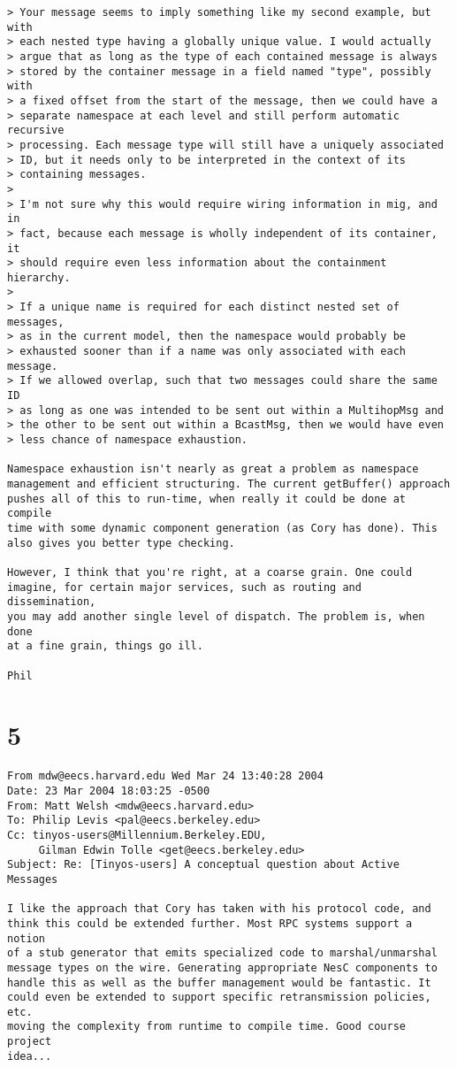\documentclass[10pt]{article}
\begin{document}
\begin{verbatim}
> Your message seems to imply something like my second example, but with 
> each nested type having a globally unique value. I would actually 
> argue that as long as the type of each contained message is always 
> stored by the container message in a field named "type", possibly with 
> a fixed offset from the start of the message, then we could have a 
> separate namespace at each level and still perform automatic recursive 
> processing. Each message type will still have a uniquely associated 
> ID, but it needs only to be interpreted in the context of its 
> containing messages.
>
> I'm not sure why this would require wiring information in mig, and in 
> fact, because each message is wholly independent of its container, it 
> should require even less information about the containment hierarchy.
>
> If a unique name is required for each distinct nested set of messages, 
> as in the current model, then the namespace would probably be 
> exhausted sooner than if a name was only associated with each message. 
> If we allowed overlap, such that two messages could share the same ID 
> as long as one was intended to be sent out within a MultihopMsg and 
> the other to be sent out within a BcastMsg, then we would have even 
> less chance of namespace exhaustion.

Namespace exhaustion isn't nearly as great a problem as namespace 
management and efficient structuring. The current getBuffer() approach 
pushes all of this to run-time, when really it could be done at compile 
time with some dynamic component generation (as Cory has done). This 
also gives you better type checking.

However, I think that you're right, at a coarse grain. One could 
imagine, for certain major services, such as routing and dissemination, 
you may add another single level of dispatch. The problem is, when done 
at a fine grain, things go ill.

Phil

\end{verbatim}

\section*{5}

\begin{verbatim}
From mdw@eecs.harvard.edu Wed Mar 24 13:40:28 2004
Date: 23 Mar 2004 18:03:25 -0500
From: Matt Welsh <mdw@eecs.harvard.edu>
To: Philip Levis <pal@eecs.berkeley.edu>
Cc: tinyos-users@Millennium.Berkeley.EDU,
     Gilman Edwin Tolle <get@eecs.berkeley.edu>
Subject: Re: [Tinyos-users] A conceptual question about Active Messages

I like the approach that Cory has taken with his protocol code, and
think this could be extended further. Most RPC systems support a notion
of a stub generator that emits specialized code to marshal/unmarshal
message types on the wire. Generating appropriate NesC components to
handle this as well as the buffer management would be fantastic. It
could even be extended to support specific retransmission policies, etc.
moving the complexity from runtime to compile time. Good course project
idea...

\end{verbatim}
\end{document}

